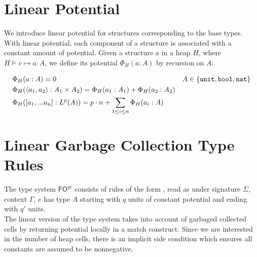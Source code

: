 \documentclass[11pt]{article}
\newcommand{\ms}[1]{\ensuremath{\mathsf{#1}}}
\newcommand{\irl}[1]{\mathtt{#1}}
\newcounter{rule}
\newcommand{\inferr}[2]{\inferrule{#2}{#1}}
\newcommand{\stack}[1]{\irl{stack}(#1)}
\newcommand{\fogc}{\ms{FO}^{gc}}
\theoremstyle{definition}
\begin{document}
\iffalse
\section{Stack vs Heap Allocated Types}
In order to share variables, we need to distinguish between types that are allocated on the stack and the heap. 
We write \fbox{$\stack{A}$} to denote that values of type $A$ will be allocataed \emph{entirely} on the stack at run time (no references into the heap). 

\begin{mathpar}
\inferr{
  \stack{A}
}
{
  A \in \{\unittyabt,\booltyabt,\irl{nat}\}
}(\text{S:Const})

\inferr{
  \stack{\prodtycst{A_1}{A_2}}
}
{
  \stack{A_1} \\
  \stack{A_2}
}(\text{S:Product})
\end{mathpar}
\fi

\section{Linear Potential}\label{sec:potential}
We introduce linear potential for structures corresponding to the base types.
With linear potential, each component of a structure is associated with a constant amount of potential. 
Given a structure $a$ in a heap $H$, where  $H \vDash v \mapsto a : A$, we define its potential 
$\Phi_H(a : A)$ by recursion on $A$: 

\begin{align*}
&\Phi_H(a : A) = 0 &A \in \{\unittycst, \booltyabt, \irl{nat}\}\\
&\Phi_H(\pairexcst{a_1}{a_2} : \prodtycst{A_1}{A_2}) = \Phi_H(a_1 : A_1) + \Phi_H(a_2 : A_2)\\
&\Phi_H([a_1,...a_n] : L^p(A)) = p\cdot n + \sum_{1 \le i \le n} \Phi_H(a_i : A)  
\end{align*}

\section{Linear Garbage Collection Type Rules}
\label{sec:typing}
The type system $\fogc$ consists of rules of the form , read as 
under signature $\Sigma$, context $\Gamma$, $e$ has type $A$ starting with $q$ units of constant potential and 
ending with $q'$ units.\\

The linear version of the type system takes into account of garbaged collected cells by returning potential locally in a match construct. Since we are interested in the number of heap cells, 
there is an implicit side condition which ensures all constants are assumed to be nonnegative.\\
\end{document}
